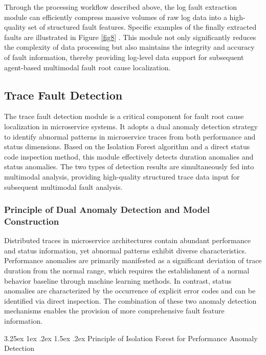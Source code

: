 \documentclass[10pt]{article}
\makeatletter
\let\oldref\ref
\renewcommand{\ref}[1]{%
    \textcolor{blue}{\oldref{#1}}%
}
\renewcommand{\paragraph}{%
    \@startsection{paragraph}{4}{\z@}%
    {3.25ex \@plus1ex \@minus.2ex}%
    {1.5ex \@plus.2ex}%
    {\normalfont\normalsize\itshape}%
}
\makeatother
\begin{document}
Through the processing workflow described above, the log fault extraction module can efficiently compress massive volumes of raw log data into a high-quality set of structured fault features. Specific examples of the finally extracted faults are illustrated in Figure \ref{fig8}. This module not only significantly reduces the complexity of data processing but also maintains the integrity and accuracy of fault information, thereby providing log-level data support for subsequent agent-based multimodal fault root cause localization.

\subsection{Trace Fault Detection}

The trace fault detection module is a critical component for fault root cause localization in microservice systems. It adopts a dual anomaly detection strategy to identify abnormal patterns in microservice traces from both performance and status dimensions. Based on the Isolation Forest algorithm and a direct status code inspection method, this module effectively detects duration anomalies and status anomalies. The two types of detection results are simultaneously fed into multimodal analysis, providing high-quality structured trace data input for subsequent multimodal fault analysis.

\subsubsection{Principle of Dual Anomaly Detection and Model Construction}

Distributed traces in microservice architectures contain abundant performance and status information, yet abnormal patterns exhibit diverse characteristics. Performance anomalies are primarily manifested as a significant deviation of trace duration from the normal range, which requires the establishment of a normal behavior baseline through machine learning methods. In contrast, status anomalies are characterized by the occurrence of explicit error codes and can be identified via direct inspection. The combination of these two anomaly detection mechanisms enables the provision of more comprehensive fault feature information.

\paragraph{Principle of Isolation Forest for Performance Anomaly Detection}
\end{document}
